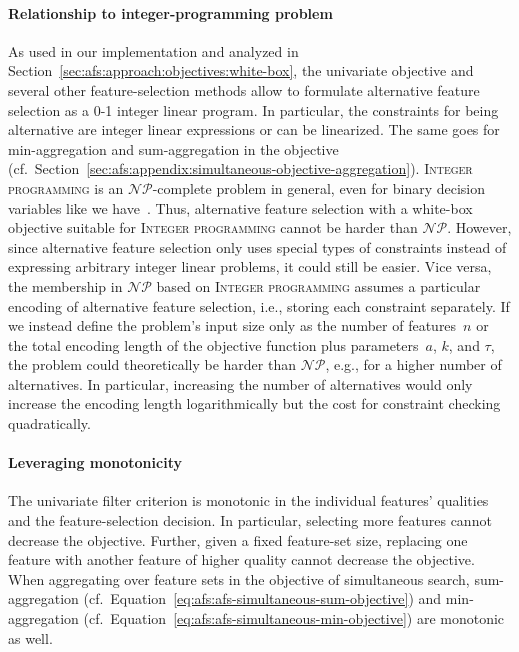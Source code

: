 \documentclass{article}
\theoremstyle{definition}
\begin{document}
\paragraph{Relationship to integer-programming problem}

As used in our implementation and analyzed in Section~\ref{sec:afs:approach:objectives:white-box}, the univariate objective and several other feature-selection methods allow to formulate alternative feature selection as a 0-1 integer linear program.
In particular, the constraints for being alternative are integer linear expressions or can be linearized.
The same goes for min-aggregation and sum-aggregation in the objective (cf.~Section~\ref{sec:afs:appendix:simultaneous-objective-aggregation}).
\textsc{Integer programming} is an $\mathcal{NP}$-complete problem in general, even for binary decision variables like we have~\cite{garey2003computers, karp1972reducibility}.
Thus, alternative feature selection with a white-box objective suitable for \textsc{Integer programming} cannot be harder than $\mathcal{NP}$.
However, since alternative feature selection only uses special types of constraints instead of expressing arbitrary integer linear problems, it could still be easier.
Vice versa, the membership in $\mathcal{NP}$ based on \textsc{Integer programming} assumes a particular encoding of alternative feature selection, i.e., storing each constraint separately.
If we instead define the problem's input size only as the number of features~$n$ or the total encoding length of the objective function plus parameters~$a$, $k$, and $\tau$, the problem could theoretically be harder than $\mathcal{NP}$, e.g., for a higher number of alternatives.
In particular, increasing the number of alternatives would only increase the encoding length logarithmically but the cost for constraint checking quadratically.

\paragraph{Leveraging monotonicity}

The univariate filter criterion is monotonic in the individual features' qualities and the feature-selection decision.
In particular, selecting more features cannot decrease the objective.
Further, given a fixed feature-set size, replacing one feature with another feature of higher quality cannot decrease the objective.
When aggregating over feature sets in the objective of simultaneous search, sum-aggregation (cf.~Equation~\ref{eq:afs:afs-simultaneous-sum-objective}) and min-aggregation (cf.~Equation~\ref{eq:afs:afs-simultaneous-min-objective}) are monotonic as well.
\end{document}
